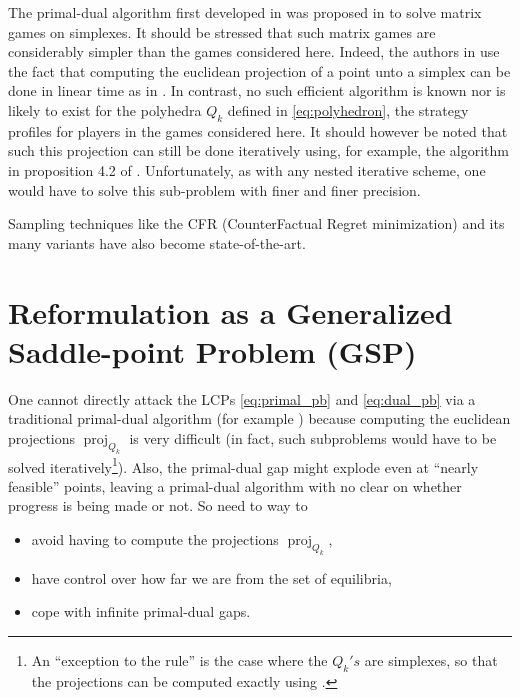 \documentclass[envcountsame]{llcns2e/llncs}
\DeclareMathOperator{\proj}{proj}
\begin{document}


The primal-dual algorithm first developed in \cite{chambolle2010} was
proposed \cite{chambolle2014ergodic} in to solve matrix games on
simplexes. It should be stressed that such matrix games are
considerably simpler than the games considered here. Indeed, the
authors in \cite{chambolle2014ergodic} use the fact that computing the
euclidean projection of a point unto a simplex can be done in linear
time as in \cite{duchi2008efficient}. In contrast, no such efficient
algorithm is known nor is likely to exist for the polyhedra $Q_k$
defined in \eqref{eq:polyhedron}, the strategy profiles for players in
the games considered here. It should however be noted that such this
projection can still be done iteratively using, for example, the
algorithm in proposition 4.2 of \cite{combettes2010dualization}%
. Unfortunately, as
with any nested iterative scheme, one would have to solve this
sub-problem with finer and finer precision.


Sampling techniques like the CFR (CounterFactual Regret minimization)
and its many variants
\cite{MartinZinkevichNIPS2007,lanctot2009monte,Bowling09012015} have
also become state-of-the-art.


\section{Reformulation as a Generalized Saddle-point Problem (GSP)}
\label{sec:gsp}
One cannot directly attack the LCPs \eqref{eq:primal_pb} and
\eqref{eq:dual_pb} via a traditional primal-dual algorithm
(for example \cite{chambolle2010,chambolle2014ergodic}) because
computing the euclidean projections $\proj_{Q_k}$ is very difficult
(in fact, such subproblems would have to be solved
iteratively\footnote{An ``exception to the rule'' is the case where
  the $Q_k's$ are simplexes, so that the projections can be computed
  exactly using \cite{duchi2008efficient}.}). Also,
the primal-dual gap might explode even at ``nearly feasible'' points,
leaving a primal-dual algorithm with no clear on whether progress is
being made or not. So need to way to
\begin{itemize}
\item avoid having to compute the projections $\proj_{Q_k}$,
\item have control over how far we are from the set of equilibria,
\item cope  with infinite primal-dual gaps.
\end{itemize}
\end{document}
